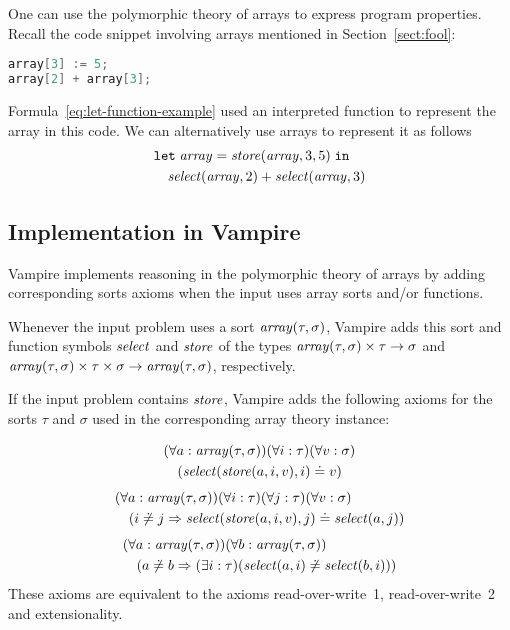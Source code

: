 One can use the polymorphic theory of arrays to express program properties. Recall the code snippet involving arrays mentioned in Section~\ref{sect:fool}:
\begin{lstlisting}[language=cpp]
array[3] := 5;
array[2] + array[3];
\end{lstlisting}
Formula~\eqref{eq:let-function-example} used an interpreted function to represent the array in this code. We can alternatively use arrays to represent it as follows
\begin{equation}\label{eq:arrays-example}
\begin{aligned}
&\mathtt{let}\;{\mathit{array}}={\mathit{store}({\mathit{array}},\allowbreak{3},\allowbreak{5})}\;\mathtt{in}\\
&\quad\mathit{select}({\mathit{array}},\allowbreak{2}) + \mathit{select}({\mathit{array}},\allowbreak{3})
\end{aligned}
\end{equation}

\subsection{Implementation in Vampire}

Vampire implements reasoning in the polymorphic theory of arrays by adding corresponding sorts axioms when the input uses array sorts and/or functions.

Whenever the input problem uses a sort $\mathit{array}(\tau,\sigma)$, Vampire adds this sort and function symbols $\mathit{select}$ and $\mathit{store}$ of the types $\mathit{array}(\tau,\sigma) \times \tau \to \sigma$ and $\mathit{array}(\tau,\sigma) \times \tau \times \sigma \to \mathit{array}(\tau,\sigma)$, respectively.

If the input problem contains $\mathit{store}$, Vampire adds the following axioms for the sorts $\tau$ and $\sigma$ used in the corresponding array theory instance:

\begin{equation}\label{eq:array-axiom-1}
  \begin{aligned}
    &(\forall a:\mathit{array}(\tau,\sigma))(\forall i:\tau)(\forall v:\sigma)\\
    &\quad(\mathit{select}({\mathit{store}({a},\allowbreak{i},\allowbreak{v})},\allowbreak{i}) \doteq v)
  \end{aligned}
\end{equation}
\begin{equation}\label{eq:array-axiom-2}
  \begin{aligned}
    &(\forall a:\mathit{array}(\tau,\sigma))(\forall i:\tau)(\forall j:\tau)(\forall v:\sigma)\\
    &\quad(i \not\doteq j \Rightarrow \mathit{select}({\mathit{store}({a},\allowbreak{i},\allowbreak{v})},\allowbreak{j}) \doteq \mathit{select}({a},\allowbreak{j}))
  \end{aligned}
\end{equation}
\begin{equation}\label{eq:array-axiom-3}
  \begin{aligned}
    &(\forall a:\mathit{array}(\tau,\sigma))(\forall b:\mathit{array}(\tau,\sigma))\\
    &\quad(a \not\doteq b \Rightarrow (\exists i:\tau)(\mathit{select}({a},\allowbreak{i}) \not\doteq \mathit{select}({b},\allowbreak{i})))
  \end{aligned}
\end{equation}
These axioms are equivalent to the axioms read-over-write~1, read-over-write~2 and extensionality.

